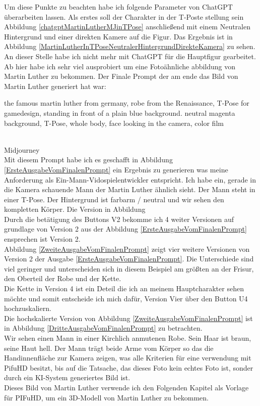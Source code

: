 Um diese Punkte zu beachten habe ich folgende Parameter von ChatGPT überarbeiten lassen. Als erstes soll der Charakter in der T-Poste stellung sein Abbildung \ref{chatgptMartinLutherMJinTPose} anschließend mit einem Neutralen Hintergrund und einer direkten Kamere auf die Figur. Das Ergebnis ist in Abbildung \ref{MartinLutherInTPoseNeutralerHintergrundDirekteKamera} zu sehen.
\\
An dieser Stelle habe ich nicht mehr mit ChatGPT für die Hauptfigur gearbeitet. Ab hier habe ich sehr viel ausprobiert um eine Fotoähnliche abbildung von Martin Luther zu bekommen. Der Finale Prompt der am ende das Bild von Martin Luther generiert hat war:
\\
\rmfamily
\begin{large}
	the famous martin luther from germany, robe from the Renaissance, T-Pose for gamedesign, standing in front of a plain blue background. neutral magenta background, T-Pose, whole body, face looking in the camera, color film
\end{large}
\sffamily
\\
Midjourney
\\
Mit diesem Prompt habe ich es geschafft in Abbildung \ref{ErsteAusgabeVomFinalenPrompt} ein Ergebnis zu generieren was meine Anforderung als Ein-Mann-Vidospielentwickler entspricht. Ich habe ein, gerade in die Kamera schauende Mann der Martin Luther ähnlich sieht. Der Mann steht in einer T-Pose. Der Hintergrund ist farbarm / neutral und wir sehen den kompletten Körper. Die Version in Abbildung 
\\
Durch die betätigung des Buttons V2 bekomme ich 4 weiter Versionen auf grundlage von Version 2 aus der Abbildung \ref{ErsteAusgabeVomFinalenPrompt} ensprechen ist Version 2.
\\
Abbildung \ref{ZweiteAusgabeVomFinalenPrompt} zeigt vier weitere Versionen von Version 2 der Ausgabe \ref{ErsteAusgabeVomFinalenPrompt}. Die Unterschiede sind viel geringer und unterscheiden sich in diesem Beispiel am größten an der Frisur, den Oberteil der Robe und der Kette.
\\
Die Kette in Version 4 ist ein Deteil die ich an meinem Hauptcharakter sehen möchte und somit entscheide ich mich dafür, Version Vier über den Button U4 hochzuskaliern.
\\
Die hochskalierte Version von Abbildung \ref{ZweiteAusgabeVomFinalenPrompt} ist in Abbildung \ref{DritteAusgabeVomFinalenPrompt} zu betrachten.
\\
Wir sehen einen Mann in einer Kirchlich anmutenen Robe. Sein Haar ist braun, seine Haut hell. Der Mann trägt beide Arme vom Körper so das die Handinnenfläche zur Kamera zeigen, was alle Kriterien für eine verwendung mit PifuHD besitzt, bis auf die Tatsache, das dieses Foto kein echtes Foto ist, sonder durch ein KI-System generiertes Bild ist.
\\
Dieses Bild von Martin Luther verwende ich den Folgenden Kapitel als Vorlage für PIFuHD, um ein 3D-Modell von Martin Luther zu bekommen.
